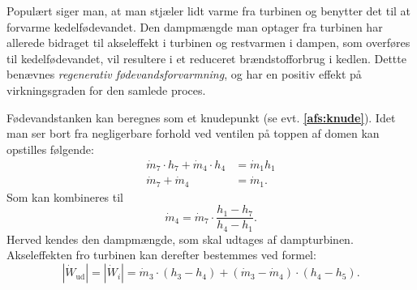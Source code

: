 Populært siger man, at man stjæler lidt varme fra turbinen og benytter det til at forvarme kedelfødevandet. Den dampmængde man optager fra turbinen har allerede bidraget til akseleffekt i turbinen og restvarmen i dampen, som overføres til kedelfødevandet, vil resultere i et reduceret brændstofforbrug i kedlen. Dettte benævnes \textit{regenerativ fødevandsforvarmning}, og har en positiv effekt på virkningsgraden for den samlede proces.

Fødevandstanken kan beregnes som et knudepunkt (se evt. \textbf{\autoref{afs:knude}}). Idet man ser bort fra negligerbare forhold ved ventilen på toppen af domen kan opstilles følgende:
\begin{align*}
  \dot{m}_7 \cdot h_7 + \dot{m}_4 \cdot h_4 &= \dot{m}_1 h_1 \\
  \dot{m}_7 + \dot{m}_4 &= \dot{m}_1
.\end{align*}
Som kan kombineres til
\[ 
\dot{m}_4 = \dot{m}_7 \cdot \frac{h_1 - h_7}{h_4 - h_1}
.\]
Herved kendes den dampmængde, som skal udtages af dampturbinen. Akseleffekten fro turbinen kan derefter bestemmes ved formel:
\[ 
\left| \dot{W}_{\mathrm{ud}} \right| = \left| \dot{W}_i \right| = \dot{m}_3 \cdot (h_3 - h_4) + (\dot{m}_3 - \dot{m}_4) \cdot (h_4 - h_5)
.\]

